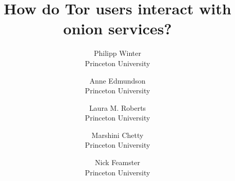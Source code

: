 \documentclass[letterpaper,twocolumn,10pt]{article}
\begin{document}
\date{}

\title{
    {\Large \textbf{How do Tor users interact with onion services?}}
}

\author{
	{\rm Philipp Winter} \\
	Princeton University
	\and
	{\rm Anne Edmundson} \\
	Princeton University
	\and
	{\rm Laura M. Roberts} \\
	Princeton University
	\and
	{\rm Marshini Chetty} \\
	Princeton University
	\and
	{\rm Nick Feamster} \\
	Princeton University
}

\maketitle

\thispagestyle{empty}



















\balance

{\footnotesize
\printbibliography}


\end{document}
